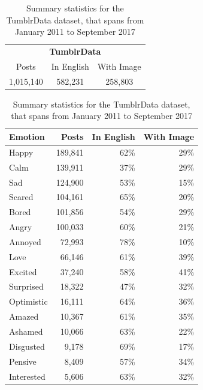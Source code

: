 \documentclass{article} %
\begin{document}
\begin{table}[H]
\caption{Summary statistics for the TumblrData dataset, that spans from January 2011 to September 2017}
\begin{center}
    \begin{tabular}{ccc}
    \multicolumn{3}{c}{{\large \textbf{TumblrData}}} \\
    \addlinespace[0.2cm]
    \toprule
    Posts & In English & With Image \\
    \midrule
    1,015,140 & 582,231 & 258,803 \\
    \bottomrule
    \end{tabular}
	
    \vspace{0.2cm}
    
    \begin{tabular}{lrrr}
    \toprule
    Emotion & Posts & In English & With Image\\
    \midrule
Happy & 189,841 & 62\% & 29\% \\
Calm & 139,911 & 37\% & 29\% \\
Sad & 124,900 & 53\% & 15\% \\
Scared & 104,161 & 65\% & 20\% \\
Bored & 101,856 & 54\% & 29\% \\
Angry & 100,033 & 60\% & 21\% \\
Annoyed & 72,993 & 78\% & 10\% \\
Love & 66,146 & 61\% & 39\% \\
Excited & 37,240 & 58\% & 41\% \\
Surprised & 18,322 & 47\% & 32\% \\
Optimistic & 16,111 & 64\% & 36\% \\
Amazed & 10,367 & 61\% & 35\% \\
Ashamed & 10,066 & 63\% & 22\% \\
Disgusted & 9,178 & 69\% & 17\% \\
Pensive & 8,409 & 57\% & 34\% \\
Interested & 5,606 & 63\% & 32\% \\
    \bottomrule
    \end{tabular}
    
    
\end{center}
\label{tumblrdata}
\end{table}
\end{document}
